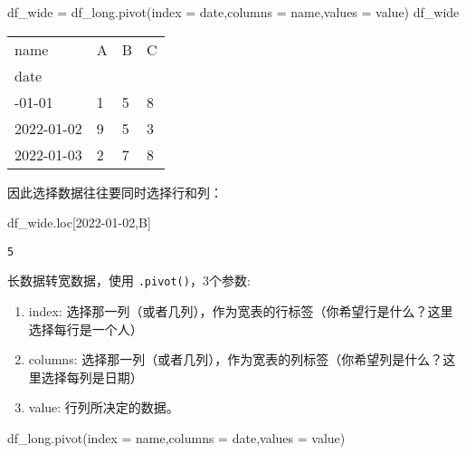 \documentclass[
  letterpaper,
  DIV=11,
  numbers=noendperiod]{scrreprt}
\newenvironment{Shaded}{\begin{snugshade}}{\end{snugshade}}
\newcommand{\NormalTok}[1]{\textcolor[rgb]{0.00,0.23,0.31}{#1}}
\newcommand{\OperatorTok}[1]{\textcolor[rgb]{0.37,0.37,0.37}{#1}}
\newcommand{\StringTok}[1]{\textcolor[rgb]{0.13,0.47,0.30}{#1}}
\providecommand{\tightlist}{%
  \setlength{\itemsep}{0pt}\setlength{\parskip}{0pt}}\usepackage{longtable,booktabs,array}
\begin{document}
\begin{Shaded}
\begin{Highlighting}[]
\NormalTok{df\_wide }\OperatorTok{=}\NormalTok{ df\_long.pivot(index }\OperatorTok{=} \StringTok{\textquotesingle{}date\textquotesingle{}}\NormalTok{,columns }\OperatorTok{=} \StringTok{\textquotesingle{}name\textquotesingle{}}\NormalTok{,values }\OperatorTok{=} \StringTok{\textquotesingle{}value\textquotesingle{}}\NormalTok{)}
\NormalTok{df\_wide}
\end{Highlighting}
\end{Shaded}

\begin{longtable}[]{@{}llll@{}}
\toprule\noalign{}
name & A & B & C \\
date & & & \\
\midrule\noalign{}
\endhead
\bottomrule\noalign{}
\endlastfoot
2022-01-01 & 1 & 5 & 8 \\
2022-01-02 & 9 & 5 & 3 \\
2022-01-03 & 2 & 7 & 8 \\
\end{longtable}

因此选择数据往往要同时选择行和列：

\begin{Shaded}
\begin{Highlighting}[]
\NormalTok{df\_wide.loc[}\StringTok{\textquotesingle{}2022{-}01{-}02\textquotesingle{}}\NormalTok{,}\StringTok{\textquotesingle{}B\textquotesingle{}}\NormalTok{]}
\end{Highlighting}
\end{Shaded}

\begin{verbatim}
5
\end{verbatim}

长数据转宽数据，使用 \texttt{.pivot()}，3个参数:

\begin{enumerate}
\def\labelenumi{\arabic{enumi}.}
\tightlist
\item
  index:
  选择那一列（或者几列），作为宽表的行标签（你希望行是什么？这里选择每行是一个人）
\item
  columns:
  选择那一列（或者几列），作为宽表的列标签（你希望列是什么？这里选择每列是日期）
\item
  value: 行列所决定的数据。
\end{enumerate}

\begin{Shaded}
\begin{Highlighting}[]
\NormalTok{df\_long.pivot(index }\OperatorTok{=} \StringTok{\textquotesingle{}name\textquotesingle{}}\NormalTok{,columns }\OperatorTok{=} \StringTok{\textquotesingle{}date\textquotesingle{}}\NormalTok{,values }\OperatorTok{=} \StringTok{\textquotesingle{}value\textquotesingle{}}\NormalTok{)}
\end{Highlighting}
\end{Shaded}
\end{document}
